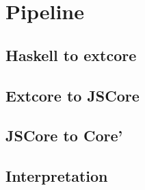 

\chapter{Pipeline}

\section{Haskell to extcore}

\section{Extcore to JSCore}

\section{JSCore to Core'}

\section{Interpretation}

